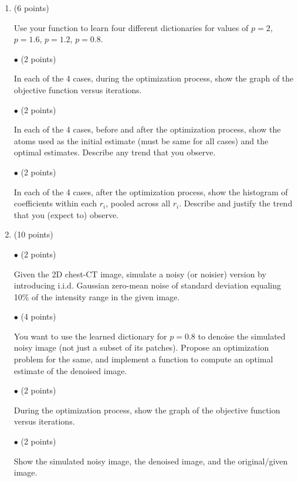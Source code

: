 \documentclass[12pt]{article}
\begin{document}
\begin {enumerate}
\begin {enumerate}
  \item (6 points)
    
    Use your function to learn four different dictionaries for values of $p = 2$, $p = 1.6$, $p = 1.2$,
    $p = 0.8$.
    
    $\bullet$  (2 points)
    
    In each of the 4 cases, during the optimization process, show the graph of the objective function versus
    iterations.
    
    $\bullet$  (2 points)
    
    In each of the 4 cases, before and after the optimization process, show the atoms used as the initial
    estimate (must be same for all cases) and the optimal estimates. Describe any trend that you observe.
    
    $\bullet$  (2 points)
    
    In each of the 4 cases, after the optimization process, show the histogram of coefficients within each
    $r_i$, pooled across all $r_i$. Describe and justify the trend that you (expect to) observe.
    
  \item (10 points)
    
    $\bullet$ (2 points)
    
    Given the 2D chest-CT image, simulate a noisy (or noisier) version by introducing i.i.d. Gaussian
    zero-mean noise of standard deviation equaling 10\% of the intensity range in the given image.
    
    $\bullet$ (4 points)
    
    You want to use the learned dictionary for $p = 0.8$ to denoise the simulated noisy image (not just a
    subset of its patches). Propose an optimization problem for the same, and implement a function to compute
    an optimal estimate of the denoised image.
    
    $\bullet$  (2 points)
    
    During the optimization process, show the graph of the objective function versus iterations.
    
    $\bullet$  (2 points)
    
    Show the simulated noisy image, the denoised image, and the original/given image.
    
  \end {enumerate}
  
  
  
  

\end{enumerate}
\end{document}
